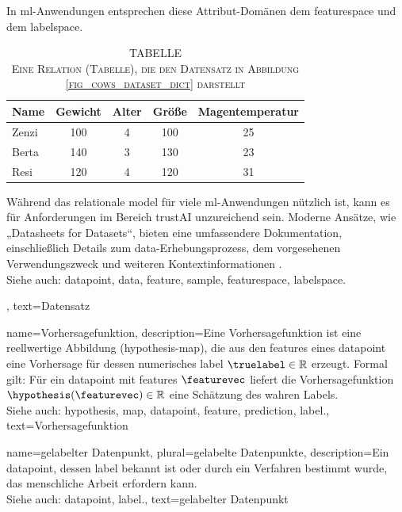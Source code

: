 {{{{{{In \gls{ml}-Anwendungen entsprechen diese Attribut-Domänen dem \gls{featurespace} und dem 
\gls{labelspace}.
\begin{table}[H]
	\caption*{
		\centering 
		\scshape TABELLE \thetable \\[0.5ex]
		\scshape Eine Relation (Tabelle), die den Datensatz in Abbildung \ref{fig_cows_dataset_dict} darstellt 
	}
	\label{tab:cowdata_dict} 
	\centering
	\begin{tabular}{lcccc}
		\hline
		\textbf{Name} & \textbf{Gewicht} & \textbf{Alter} & \textbf{Größe} & \textbf{Magentemperatur} \\
		\hline
		Zenzi & 100 & 4 & 100 & 25 \\
		Berta & 140 & 3 & 130 & 23 \\
		Resi  & 120 & 4 & 120 & 31 \\
		\hline
	\end{tabular}
\end{table}
Während das relationale \gls{model} für viele \gls{ml}-Anwendungen nützlich ist, 
kann es für Anforderungen im Bereich \gls{trustAI} unzureichend sein. Moderne Ansätze, 
wie „Datasheets for Datasets“, bieten eine umfassendere Dokumentation, 
einschließlich Details zum \gls{data}-Erhebungsprozess, dem vorgesehenen Verwendungszweck 
und weiteren Kontextinformationen \cite{DatasheetData2021}.
\\
Siehe auch: \gls{datapoint}, \gls{data}, \gls{feature}, \gls{sample}, \gls{featurespace}, \gls{labelspace}.},
text={Datensatz}
}



{name={Vorhersagefunktion},
description={Eine Vorhersagefunktion ist eine reellwertige Abbildung (\gls{hypothesis}-\gls{map}),
 die aus den \glspl{feature} eines \gls{datapoint} eine Vorhersage für dessen numerisches \gls{label} $\truelabel \in \mathbb{R}$ erzeugt. 
Formal gilt: Für ein \gls{datapoint} mit \glspl{feature} $\featurevec$ liefert die Vorhersagefunktion $\hypothesis(\featurevec) \in \mathbb{R}$ 
eine Schätzung des wahren Labels.
\\
Siehe auch: \gls{hypothesis}, \gls{map}, \gls{datapoint}, \gls{feature}, \gls{prediction}, \gls{label}.},
text={Vorhersagefunktion}
}



{name={gelabelter Datenpunkt}, plural={gelabelte Datenpunkte},
description={Ein \gls{datapoint}, dessen \gls{label} bekannt ist oder 
durch ein Verfahren bestimmt wurde, das menschliche Arbeit erfordern kann.
\\
Siehe auch: \gls{datapoint}, \gls{label}.},
text={gelabelter Datenpunkt}
}

}}}}

